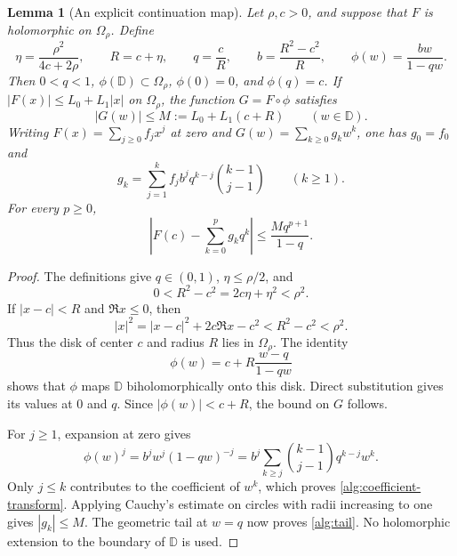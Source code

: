 \documentclass[reqno]{amsart}
\newtheorem{lemma}[theorem]{Lemma}
\theoremstyle{definition}
\theoremstyle{remark}
\newcommand{\D}{\mathbb D}
\begin{document}
\begin{lemma}[An explicit continuation map]
\label{alg:map}
Let \(\rho,c>0\), and suppose that \(F\) is holomorphic on
\(\Omega_\rho\).
Define
\begin{equation}
 \eta=\frac{\rho^2}{4c+2\rho},\qquad
 R=c+\eta,\qquad q=\frac cR,\qquad
 b=\frac{R^2-c^2}{R},\qquad
 \phi(w)=\frac{bw}{1-qw}.
 \label{alg:map-parameters}
\end{equation}
Then \(0<q<1\), \(\phi(\D)\subset\Omega_\rho\),
\(\phi(0)=0\), and \(\phi(q)=c\).
If \(|F(x)|\le L_0+L_1|x|\) on \(\Omega_\rho\), the function
\(G=F\circ\phi\) satisfies
\[
 |G(w)|\le M:=L_0+L_1(c+R)\qquad(w\in\D).
 \]
Writing \(F(x)=\sum_{j\ge0}f_jx^j\) at zero and
\(G(w)=\sum_{k\ge0}g_kw^k\), one has \(g_0=f_0\) and
\begin{equation}
 g_k=\sum_{j=1}^k
        f_j b^j q^{k-j}\binom{k-1}{j-1}
       \qquad(k\ge1).
 \label{alg:coefficient-transform}
\end{equation}
For every \(p\ge0\),
\begin{equation}
 \left|F(c)-\sum_{k=0}^p g_kq^k\right|
    \le\frac{Mq^{p+1}}{1-q}.
 \label{alg:tail}
\end{equation}
\end{lemma}

\begin{proof}
The definitions give \(q\in(0,1)\), \(\eta\le\rho/2\), and
\[
 0<R^2-c^2=2c\eta+\eta^2<\rho^2.
 \]
If \(|x-c|<R\) and \(\Re x\le0\), then
\[
 |x|^2=|x-c|^2+2c\Re x-c^2<R^2-c^2<\rho^2.
 \]
Thus the disk of center \(c\) and radius \(R\) lies in
\(\Omega_\rho\).
The identity
\[
 \phi(w)=c+R\frac{w-q}{1-qw}
 \]
shows that \(\phi\) maps \(\D\) biholomorphically onto this
disk.  Direct substitution gives its values at \(0\) and \(q\).
Since \(|\phi(w)|<c+R\), the bound on \(G\) follows.

For \(j\ge1\), expansion at zero gives
\[
 \phi(w)^j=b^j w^j(1-qw)^{-j}
  =b^j\sum_{k\ge j}
       \binom{k-1}{j-1}q^{k-j}w^k.
 \]
Only \(j\le k\) contributes to the coefficient of \(w^k\),
which proves \eqref{alg:coefficient-transform}.
Applying Cauchy's estimate on circles with radii increasing to
one gives \(|g_k|\le M\).
The geometric tail at \(w=q\) now proves \eqref{alg:tail}.
No holomorphic extension to the boundary of \(\D\) is used.
\end{proof}
\end{document}
